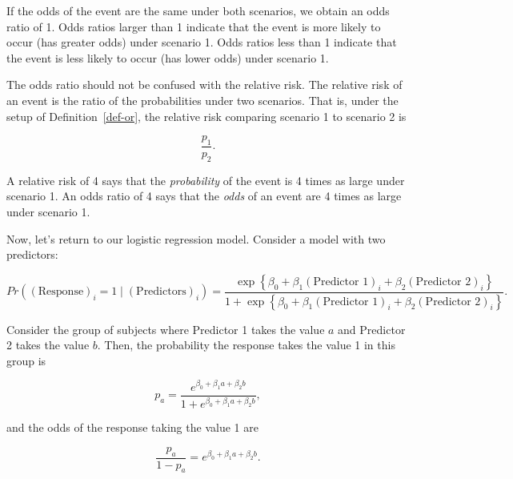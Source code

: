 \documentclass[
  letterpaper,
  DIV=11,
  numbers=noendperiod]{scrreprt}
\theoremstyle{definition}
\theoremstyle{definition}
\theoremstyle{remark}
\begin{document}
If the odds of the event are the same under both scenarios, we obtain an
odds ratio of 1. Odds ratios larger than 1 indicate that the event is
more likely to occur (has greater odds) under scenario 1. Odds ratios
less than 1 indicate that the event is less likely to occur (has lower
odds) under scenario 1.

\begin{tcolorbox}[enhanced jigsaw, left=2mm, toprule=.15mm, arc=.35mm, breakable, opacitybacktitle=0.6, opacityback=0, rightrule=.15mm, colbacktitle=quarto-callout-warning-color!10!white, coltitle=black, leftrule=.75mm, toptitle=1mm, colframe=quarto-callout-warning-color-frame, titlerule=0mm, title=\textcolor{quarto-callout-warning-color}{\faExclamationTriangle}\hspace{0.5em}{Warning}, bottomrule=.15mm, colback=white, bottomtitle=1mm]

The odds ratio should not be confused with the relative risk. The
relative risk of an event is the ratio of the probabilities under two
scenarios. That is, under the setup of Definition~\ref{def-or}, the
relative risk comparing scenario 1 to scenario 2 is

\[\frac{p_1}{p_2}.\]

A relative risk of 4 says that the \emph{probability} of the event is 4
times as large under scenario 1. An odds ratio of 4 says that the
\emph{odds} of an event are 4 times as large under scenario 1.

\end{tcolorbox}

Now, let's return to our logistic regression model. Consider a model
with two predictors:

\[Pr\left((\text{Response})_i = 1 \mid (\text{Predictors})_i \right) = \frac{\exp\left\{\beta_0 + \beta_1 (\text{Predictor 1})_i + \beta_2 (\text{Predictor 2})_i\right\}}{1 + \exp\left\{\beta_0 + \beta_1 (\text{Predictor 1})_i + \beta_2 (\text{Predictor 2})_i\right\}}.\]

Consider the group of subjects where Predictor 1 takes the value \(a\)
and Predictor 2 takes the value \(b\). Then, the probability the
response takes the value 1 in this group is

\[p_a = \frac{e^{\beta_0 + \beta_1 a + \beta_2 b}}{1 + e^{\beta_0 + \beta_1 a + \beta_2 b}},\]

and the odds of the response taking the value 1 are

\[\frac{p_a}{1 - p_a} = e^{\beta_0 + \beta_1 a + \beta_2 b}.\]
\end{document}
